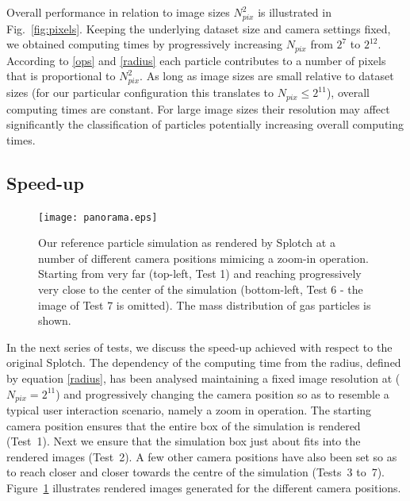 \documentclass[preprint,5pt]{elsarticle}
\begin{document}
Overall performance in relation to image sizes $N_{pix}^2$ is illustrated in Fig.~\ref{fig:pixels}. Keeping the underlying dataset size and camera settings fixed, we obtained computing times by progressively increasing
$N_{pix}$ from ${2}^{7}$ to ${2}^{12}$. According to \eqref{ops} and \eqref{radius} each particle contributes to a number of pixels that is proportional to $N_{pix}^{2}$. As long as image sizes are small relative to dataset sizes (for our particular configuration this translates to $N_{pix} \le 2^{11}$), overall computing times are constant. For large image sizes their resolution may affect significantly the classification of particles potentially increasing overall computing times.

\subsection{Speed-up}
\label{sec:speed-up}
\begin{figure}
\texttt{[image: panorama.eps]}
\caption{Our reference particle simulation as rendered by Splotch at a number of different camera positions mimicing a zoom-in operation. Starting from very far (top-left, Test 1) and reaching progressively very close to the center of the simulation (bottom-left, Test 6 - the image of Test 7 is omitted). The mass distribution of gas particles is shown.}
\label{fig:panorama}
\end{figure}

In the next series of tests, we discuss the speed-up achieved with respect to the original Splotch. 
The dependency of the computing time from the radius, defined by equation \eqref{radius}, has been analysed maintaining a fixed image resolution at ($N_{pix} = 2^{11}$) and progressively changing the camera position 
so as to resemble a typical user interaction scenario, namely a zoom in operation. 
The starting camera position ensures that the entire box of the simulation is rendered (Test~1). 
Next we ensure that the simulation box just about fits into the rendered images (Test~2). 
A few other camera positions have also been set so as to reach closer and closer towards the 
centre of the simulation (Tests~3 to~7). Figure~\ref{fig:panorama} illustrates rendered images generated for the different camera positions.
\end{document}
